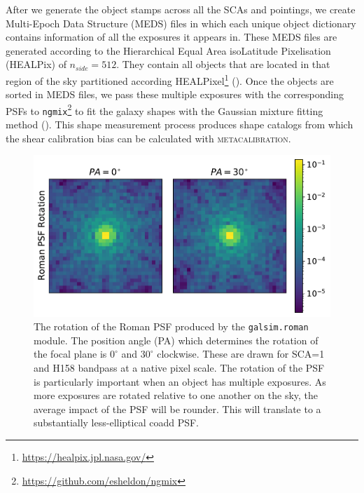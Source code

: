 \documentclass[fleqn,usenatbib]{mnras}
\begin{document}
After we generate the object stamps across all the SCAs and pointings, we create Multi-Epoch Data Structure (MEDS) files in which each unique object dictionary contains information of all the exposures it appears in. These MEDS files are generated according to the Hierarchical Equal Area isoLatitude Pixelisation (HEALPix) of $n_{side}=512$. They contain all objects that are located in that region of the sky partitioned according HEALPixel\footnote{\url{https://healpix.jpl.nasa.gov/}} (\citealt{2005ApJ...622..759G, Zonca2019}). Once the objects are sorted in MEDS files, we pass these multiple exposures with the corresponding PSFs to \texttt{ngmix}\footnote{\url{ https://github.com/esheldon/ngmix}} to fit the galaxy shapes with the Gaussian mixture fitting method (\citealt{2014MNRAS.444L..25S}). This shape measurement process produces shape catalogs from which the shear calibration bias can be calculated with \textsc{metacalibration}.

\begin{figure}
	\includegraphics[width=\columnwidth]{psf_rotation.pdf}
    \caption{The rotation of the Roman PSF produced by the \texttt{galsim.roman} module. The position angle (PA) which determines the rotation of the focal plane is $0^{\circ}$ and $30^{\circ}$ clockwise. These are drawn for SCA=1 and H158 bandpass at a native pixel scale. The rotation of the PSF is particularly important when an object has multiple exposures. As more exposures are rotated relative to one another on the sky, the average impact of the PSF will be rounder. This will translate to a substantially less-elliptical coadd PSF.}
    \label{fig:psfrot}
\end{figure}
\end{document}

